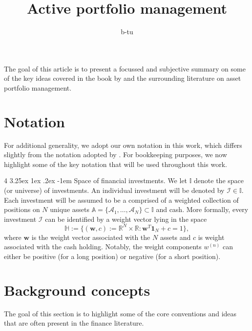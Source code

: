 \documentclass[12pt]{article}
\title{Active portfolio management}
\author{
	b-tu
}
\makeatletter
\renewcommand\paragraph{%
	\@startsection{paragraph}
	{4}
	{\z@}
	{3.25ex \@plus1ex \@minus.2ex}
	{-1em}
	{\normalfont\normalsize\bfseries\maybe@addperiod}%
}
\newcommand{\maybe@addperiod}[1]{%
	#1\@addpunct{.}%
}
\makeatother
\begin{document}
\maketitle
The goal of this article is to present a focussed and subjective summary on some of the key ideas covered in the book by \cite{grinold1999} and the surrounding literature on asset portfolio management.
\section{Notation}
For additional generality, we adopt our own notation in this work, which differs slightly from the notation adopted by \cite{grinold1999}. For bookkeeping purposes, we now highlight some of the key notation that will be used throughout this work.

\paragraph{Space of financial investments.} We let $\mathbb{I}$ denote the space (or universe) of investments. An individual investment will be denoted by $\mathcal{I} \in \mathbb{I}$. Each investment will be assumed to be a comprised of a weighted collection of positions on $N$ unique assets $\mathbb{A} = \{\mathcal{A}_1, \dots, \mathcal{A}_N\} \subset \mathbb{I}$ and cash. More formally, every investment $\mathcal{I}$ can be identified by a weight vector lying in the space
\begin{equation}
	\mathbb{H} := \{(\mathbf{w}, c) := \mathbb{R}^N \times \mathbb{R}: \mathbf{w}^T \mathbf{1}_N + c = 1\},
\end{equation}
where $\mathbf{w}$ is the weight vector associated with the $N$ assets and $c$ is weight associated with the cash holding.  Notably, the weight components $w^{(n)}$ can either be positive (for a long position) or negative (for a short position).
\section{Background concepts}
The goal of this section is to highlight some of the core conventions and ideas that are often present in the finance literature.
\end{document}
